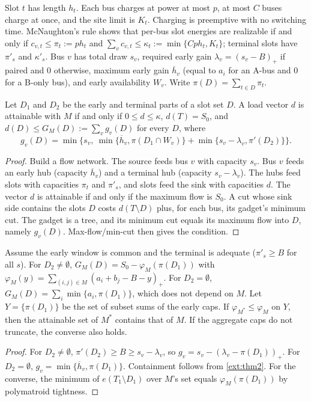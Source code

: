 Slot $t$ has length $h_t$. Each bus charges at power at most $p$, at most $C$
buses charge at once, and the site limit is $K_t$. Charging is preemptive with
no switching time. McNaughton's rule shows that per-bus slot energies are
realizable if and only if $c_{v,t}\le\pi_t:=ph_t$ and
$\sum_vc_{v,t}\le\kappa_t:=\min\{Cph_t,K_t\}$; terminal slots have $\pi'_s$
and $\kappa'_s$. Bus $v$ has total draw $s_v$, required early gain
$\lambda_v=(s_v-B)_+$ if paired and $0$ otherwise, maximum early gain
$\overline h_v$ (equal to $a_i$ for an A-bus and $0$ for a B-only bus), and
early availability $W_v$. Write $\pi(D)=\sum_{t\in D}\pi_t$.

\begin{theorem}\label{ext:thm2}
Let $D_1$ and $D_2$ be the early and terminal parts of a slot set $D$. A load
vector $d$ is attainable with $M$ if and only if $0\le d\le\kappa$,
$d(T)=S_0$, and $d(D)\le G_M(D):=\sum_vg_v(D)$ for every $D$, where
\[
g_v(D)=\min\bigl\{s_v,\ \min\{\overline h_v,\pi(D_1\cap W_v)\}+\min\{s_v-\lambda_v,\pi'(D_2)\}\bigr\}.
\]
\end{theorem}
\begin{proof}
Build a flow network. The source feeds bus $v$ with capacity $s_v$. Bus $v$
feeds an early hub (capacity $\overline h_v$) and a terminal hub (capacity
$s_v-\lambda_v$). The hubs feed slots with capacities $\pi_t$ and $\pi'_s$,
and slots feed the sink with capacities $d$. The vector $d$ is attainable if
and only if the maximum flow is $S_0$. A cut whose sink side contains the
slots $D$ costs $d(T\setminus D)$ plus, for each bus, its gadget's minimum
cut. The gadget is a tree, and its minimum cut equals its maximum flow into
$D$, namely $g_v(D)$. Max-flow/min-cut then gives the condition.
\end{proof}

\begin{theorem}\label{ext:thm3}
Assume the early window is common and the terminal is adequate
($\pi'_s\ge B$ for all $s$). For $D_2\neq\emptyset$,
$G_M(D)=S_0-\varphi_M(\pi(D_1))$ with
$\varphi_M(y)=\sum_{(i,j)\in M}(a_i+b_j-B-y)_+$. For $D_2=\emptyset$,
$G_M(D)=\sum_i\min\{a_i,\pi(D_1)\}$, which does not depend on $M$. Let
$Y=\{\pi(D_1)\}$ be the set of subset sums of the early caps. If
$\varphi_{M^*}\le\varphi_M$ on $Y$, then the attainable set of $M^*$ contains
that of $M$. If the aggregate caps do not truncate, the converse also holds.
\end{theorem}
\begin{proof}
For $D_2\ne\emptyset$, $\pi'(D_2)\ge B\ge s_v-\lambda_v$, so
$g_v=s_v-(\lambda_v-\pi(D_1))_+$. For $D_2=\emptyset$,
$g_v=\min\{\overline h_v,\pi(D_1)\}$. Containment follows from
\cref{ext:thm2}. For the converse, the minimum of $e(T_1\setminus D_1)$ over
$M$'s set equals $\varphi_M(\pi(D_1))$ by polymatroid tightness.
\end{proof}

